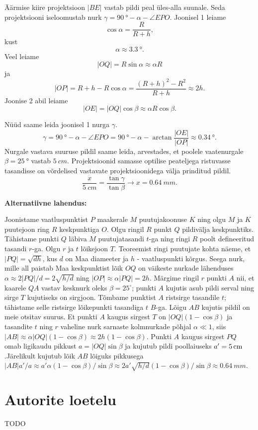 \documentclass[10pt]{article}
\begin{document}
Äärmise kiire projektsioon $|BE|$ vastab pildi peal üles-alla suunale. Seda projektsiooni iseloomustab nurk $\gamma=\SI{90}{\degree}-\alpha -\angle EPO$. 
Joonisel 1 leiame $$\cos{\alpha}=\frac{R}{R+h},$$ kust $$\alpha\approx\SI{3.3}{\degree}.$$ Veel leiame $$|OQ|=R\sin{\alpha}\approx \alpha R$$ ja
\[
|OP|=R+h-R\cos{\alpha}=\frac{(R+h)^2 - R^2}{R+h}\approx 2h.
\]
Joonise 2 abil leiame $$|OE|=|OQ|\cos{\beta}\approx \alpha R\cos{\beta}.$$

Nüüd saame leida joonisel 1 nurga $\gamma$.
$$\gamma = \SI{90}{\degree}-\alpha-\angle EPO = \SI{90}{\degree}-\alpha-\arctan{\frac{|OE|}{|OP|}}\approx \SI{0.34}{\degree}.$$
Nurgale vastava suuruse pildil saame leida, arvestades, et poolele vaatenurgale $\beta=\SI{25}{\degree}$ vastab $\SI{5}{cm}$. Projektsioonid samasse optilise peateljega ristuvasse tasandisse on võrdelised vastavate projektsioonidega välja prinditud pildil. $$\frac{x}{\SI{5}{cm}}=\frac{\tan{\gamma}}{\tan{\beta}} \rightarrow x = \SI{0.64}{mm}.$$

\textbf{Alternatiivne lahendus:}

Joonistame vaatluspunktist $P$ maakerale $M$ puutujakoonuse $K$ ning olgu $M$ ja $K$ puutejoon ring $R$ keskpunktiga $O$. Olgu ringil $R$ punkt $Q$ pildivälja keskpunktiks. Tähistame punkti $Q$ läbiva $M$ puutujatasandi $t$-ga ning ringi $R$ poolt defineeritud tasandi $r$-ga. Olgu $r$ ja $t$ lõikejoon $T$. Teoreemist ringi puutujate kohta näeme, et $|PQ|=\sqrt{dh}$, kus $d$ on Maa diameeter ja $h$ - vaatluspunkti kõrgus. Seega nurk, mille all paistab Maa keskpunktist lõik $OQ$ on väikeste nurkade lähenduses $\alpha \approx 2|PQ|/d=2\sqrt{h/d}$ ning $|OP|\approx \alpha |PQ|=2h$. Märgime ringil $r$ punkti $A$ nii, et kaarele $QA$ vastav kesknurk oleks $\beta=25^\circ$; punkti $A$ kujutis asub pildi serval ning sirge $T$ kujutiseks on sirgjoon. Tõmbame punktist $A$ ristsirge tasandile $t$; tähistame selle ristsirge lõikepunkti tasandiga $t$ $B$-ga. Lõigu $AB$ kujutis pildil on meie otsitav suurus. Et punkti $A$ kaugus sirgest $T$ on $|OQ|(1-\cos\beta)$ ja tasandite $t$ ning $r$ vaheline nurk sarnaste kolmnurkade põhjal $\alpha \ll 1$, siis $|AB|\approx \alpha |OQ|(1-\cos\beta)\approx 2h(1-\cos\beta)$. Punkti $A$ kaugus sirgest $PQ$ omab ligikaudu pikkust $a=|OQ|\sin\beta$ ja kujutub pildi poollaiuseks $a'=\SI 5{cm}$.Järelikult kujutub lõik $AB$ lõiguks pikkusega $|AB|a'/a\approx a'\alpha(1-\cos\beta)/\sin\beta\approx 2a'\sqrt{h/d}(1-\cos\beta)/\sin\beta\approx \SI{0.64}{mm}$.
\probend
\bigskip
\newpage

\section{Autorite loetelu}

TODO
\end{document}
